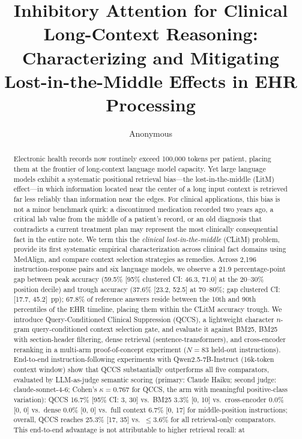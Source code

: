 \documentclass{article}
\title{Inhibitory Attention for Clinical Long-Context Reasoning:\\
Characterizing and Mitigating Lost-in-the-Middle Effects in EHR Processing}
\author{Anonymous}
\begin{document}
\maketitle

\begin{abstract}
Electronic health records now routinely exceed 100,000 tokens per patient, placing
them at the frontier of long-context language model capacity. Yet large language
models exhibit a systematic positional retrieval bias---the lost-in-the-middle
(LitM) effect---in which information located near the center of a long input
context is retrieved far less reliably than information near the edges. For
clinical applications, this bias is not a minor benchmark quirk: a discontinued
medication recorded two years ago, a critical lab value from the middle of a
patient's record, or an old diagnosis that contradicts a current treatment plan
may represent the most clinically consequential fact in the entire note. We term
this the \emph{clinical lost-in-the-middle} (CLitM) problem, provide its first
systematic empirical characterization across clinical fact domains using MedAlign,
and compare context selection strategies as remedies. Across 2,196
instruction-response pairs and six language models, we observe a 21.9
percentage-point gap between peak accuracy (59.5\% [95\% clustered CI: 46.3, 71.0] at
the 20--30\% position decile) and trough accuracy (37.6\% [23.2, 52.5] at
70--80\%; gap clustered CI: [17.7, 45.2]~pp); 67.8\% of reference answers reside between the 10th and 90th
percentiles of the EHR timeline, placing them within the CLitM accuracy trough.
We introduce Query-Conditioned Clinical Suppression (QCCS), a lightweight
character $n$-gram query-conditioned context selection gate, and evaluate it
against BM25, BM25 with section-header filtering, dense retrieval
(sentence-transformers), and cross-encoder reranking in a multi-arm
proof-of-concept experiment ($N{=}83$ held-out instructions).
End-to-end instruction-following experiments with Qwen2.5-7B-Instruct (16k-token
context window) show that QCCS substantially outperforms all five comparators,
evaluated by LLM-as-judge semantic scoring (primary: Claude Haiku; second judge:
claude-sonnet-4-6; Cohen's $\kappa{=}0.767$ for QCCS, the arm with meaningful
positive-class variation): QCCS 16.7\% [95\% CI: 3, 30]
vs.\ BM25 3.3\% [0, 10] vs.\ cross-encoder 0.0\% [0, 0] vs.\ dense 0.0\% [0, 0]
vs.\ full context 6.7\% [0, 17] for middle-position instructions; overall, QCCS
reaches 25.3\% [17, 35] vs.\ $\leq$3.6\% for all retrieval-only comparators.
This end-to-end advantage is not attributable to higher retrieval recall: at

\end{abstract}
\end{document}
